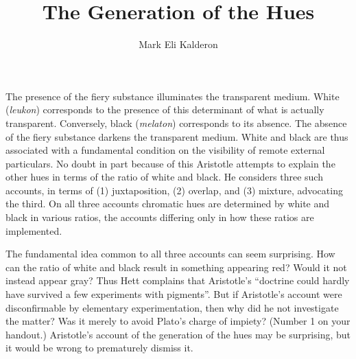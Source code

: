 %
%
%

\newcommand{\change}{\textcolor{blue}{\textbf{CHANGE SLIDE}}}
\newcommand\myauthor{Mark Eli Kalderon} 
\newcommand\mytitle{The Generation of the Hues}
\newcommand\myinstitution{University College London}


\usepackage{pgf}
\usepackage{tikz}
\usepackage{hyperref}
\usepackage{setspace}
\doublespacing


\title{\mytitle}

\author{\myauthor}
\institute{\myinstitution}

\date{}



\frame{\maketitle}

The presence of the fiery substance illuminates the transparent me\-di\-um. White (\emph{leukon}) corresponds to the presence of this determinant of what is actually transparent. Conversely, black (\emph{melaton}) corresponds to its absence. The absence of the fiery substance darkens the transparent medium. White and black are thus associated with a fundamental condition on the visibility of remote external particulars. No doubt in part because of this Aristotle attempts to explain the other hues in terms of the ratio of white and black. He considers three such accounts, in terms of (1) juxtaposition, (2) overlap, and (3) mixture, advocating the third. On all three accounts chromatic hues are determined by white and black in various ratios, the accounts differing only in how these ratios are implemented. 

The fundamental idea common to all three accounts can seem surprising. How can the ratio of white and black result in something appearing red? Would it not instead appear gray? Thus Hett complains that Aristotle's ``doctrine could hardly have survived a few experiments with pigments''. But if Aristotle's account were disconfirmable by elementary experimentation, then why did he not investigate the matter? Was it merely to avoid Plato's charge of impiety? (Number 1 on your handout.) Aristotle's account of the generation of the hues may be surprising, but it would be wrong to prematurely dismiss it. 


